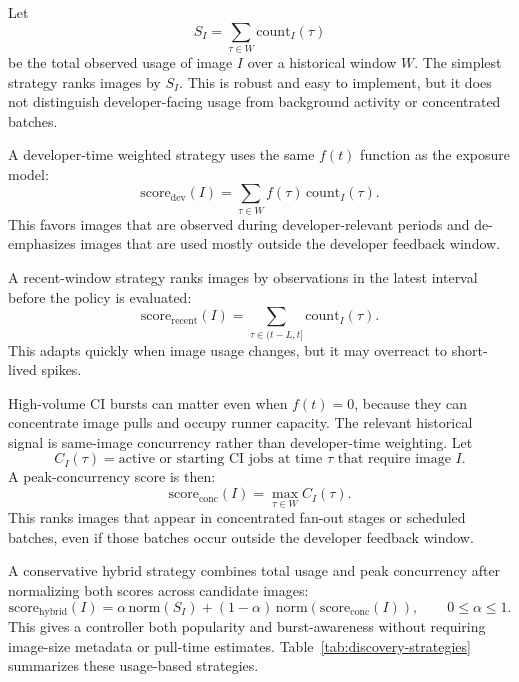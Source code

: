 \documentclass[11pt,a4paper]{article}
\begin{document}
Let
\begin{equation}
S_I=\sum_{\tau\in W}\mathrm{count}_I(\tau)
\end{equation}
be the total observed usage of image \(I\) over a historical window \(W\). The simplest strategy ranks images by \(S_I\). This is robust and easy to implement, but it does not distinguish developer-facing usage from background activity or concentrated batches.

A developer-time weighted strategy uses the same \(f(t)\) function as the exposure model:
\begin{equation}
\mathrm{score}_{\mathrm{dev}}(I)
=
\sum_{\tau\in W} f(\tau)\,\mathrm{count}_I(\tau).
\end{equation}
This favors images that are observed during developer-relevant periods and de-emphasizes images that are used mostly outside the developer feedback window.

A recent-window strategy ranks images by observations in the latest interval before the policy is evaluated:
\begin{equation}
\mathrm{score}_{\mathrm{recent}}(I)
=
\sum_{\tau\in(t-L,t]}\mathrm{count}_I(\tau).
\end{equation}
This adapts quickly when image usage changes, but it may overreact to short-lived spikes.

High-volume CI bursts can matter even when \(f(t)=0\), because they can concentrate image pulls and occupy runner capacity. The relevant historical signal is same-image concurrency rather than developer-time weighting. Let
\begin{equation}
C_I(\tau)=\text{active or starting CI jobs at time \(\tau\) that require image \(I\)}.
\end{equation}
A peak-concurrency score is then:
\begin{equation}
\mathrm{score}_{\mathrm{conc}}(I)=\max_{\tau\in W} C_I(\tau).
\end{equation}
This ranks images that appear in concentrated fan-out stages or scheduled batches, even if those batches occur outside the developer feedback window.

A conservative hybrid strategy combines total usage and peak concurrency after normalizing both scores across candidate images:
\begin{equation}
\mathrm{score}_{\mathrm{hybrid}}(I)
=
\alpha\,\mathrm{norm}(S_I)
+
(1-\alpha)\,\mathrm{norm}(\mathrm{score}_{\mathrm{conc}}(I)),
\qquad 0\le\alpha\le 1.
\end{equation}
This gives a controller both popularity and burst-awareness without requiring image-size metadata or pull-time estimates. Table~\ref{tab:discovery-strategies} summarizes these usage-based strategies.
\end{document}
